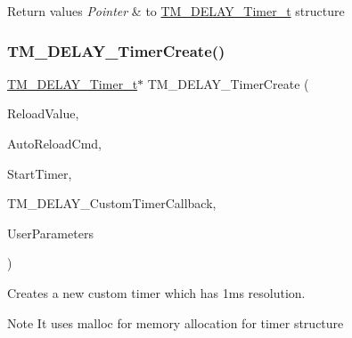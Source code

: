 \begin{DoxyRetVals}{Return values}
{\em Pointer} & to \hyperlink{group___t_m___d_e_l_a_y___typedefs_gaf0beeb077a757f34c8b176464d9a0e85}{T\+M\+\_\+\+D\+E\+L\+A\+Y\+\_\+\+Timer\+\_\+t} structure \\
\hline
\end{DoxyRetVals}
\mbox{\label{group___t_m___d_e_l_a_y___timer___functions_ga848f0e5f378dc5c28b3a5a0a86153118}} 
\subsubsection{\texorpdfstring{T\+M\+\_\+\+D\+E\+L\+A\+Y\+\_\+\+Timer\+Create()}{TM\_DELAY\_TimerCreate()}}
{\footnotesize\ttfamily \hyperlink{group___t_m___d_e_l_a_y___typedefs_gaf0beeb077a757f34c8b176464d9a0e85}{T\+M\+\_\+\+D\+E\+L\+A\+Y\+\_\+\+Timer\+\_\+t}$\ast$ T\+M\+\_\+\+D\+E\+L\+A\+Y\+\_\+\+Timer\+Create (\begin{DoxyParamCaption}\item[{uint32\+\_\+t}]{Reload\+Value,  }\item[{uint8\+\_\+t}]{Auto\+Reload\+Cmd,  }\item[{uint8\+\_\+t}]{Start\+Timer,  }\item[{void($\ast$)(struct \hyperlink{struct___t_m___d_e_l_a_y___timer__t}{\+\_\+\+T\+M\+\_\+\+D\+E\+L\+A\+Y\+\_\+\+Timer\+\_\+t} $\ast$, void $\ast$)}]{T\+M\+\_\+\+D\+E\+L\+A\+Y\+\_\+\+Custom\+Timer\+Callback,  }\item[{void $\ast$}]{User\+Parameters }\end{DoxyParamCaption})}



Creates a new custom timer which has 1ms resolution. 

\begin{DoxyNote}{Note}
It uses malloc for memory allocation for timer structure 
\end{DoxyNote}

